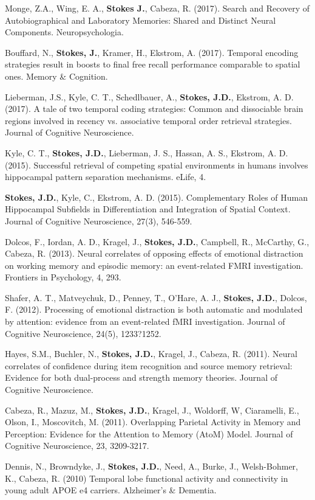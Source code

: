 \documentclass[line,margin,10pt]{res}
\begin{document}
\begin{resume}
Monge, Z.A., Wing, E. A., \textbf{Stokes J.}, Cabeza, R. (2017). Search and Recovery of Autobiographical and Laboratory Memories: Shared and Distinct Neural Components. Neuropsychologia.

Bouffard, N., \textbf{Stokes, J.}, Kramer, H., Ekstrom, A. (2017). Temporal encoding strategies result in boosts to final free recall performance comparable to spatial ones. Memory \& Cognition.

Lieberman, J.S., Kyle, C. T., Schedlbauer, A., \textbf{Stokes, J.D.}, Ekstrom, A. D. (2017). A tale of two temporal coding strategies: Common and dissociable brain regions involved in recency vs. associative temporal order retrieval strategies. Journal of Cognitive Neuroscience.

Kyle, C. T., \textbf{Stokes, J.D.}, Lieberman, J. S., Hassan, A. S., Ekstrom, A. D. (2015). Successful retrieval of competing spatial environments in humans involves hippocampal pattern separation mechanisms. eLife, 4. 

\textbf{Stokes, J.D.}, Kyle, C., Ekstrom, A. D. (2015). Complementary Roles of Human Hippocampal Subfields in Differentiation and Integration of Spatial Context. Journal of Cognitive Neuroscience, 27(3), 546-559. 

Dolcos, F., Iordan, A. D., Kragel, J., \textbf{Stokes, J.D.}, Campbell, R., McCarthy, G., Cabeza, R. (2013). Neural correlates of opposing effects of emotional distraction on working memory and episodic memory: an event-related FMRI investigation. Frontiers in Psychology, 4, 293. 

Shafer, A. T., Matveychuk, D., Penney, T., O'Hare, A. J., \textbf{Stokes, J.D.}, Dolcos, F. (2012). Processing of emotional distraction is both automatic and modulated by attention: evidence from an event-related fMRI investigation. Journal of Cognitive Neuroscience, 24(5), 1233?1252.
 		
Hayes, S.M., Buchler, N., \textbf{Stokes, J.D.}, Kragel, J., Cabeza, R. (2011). Neural correlates of confidence during item recognition and source memory retrieval: Evidence for both dual-process and strength memory theories. Journal of Cognitive Neuroscience.
	
Cabeza, R., Mazuz, M., \textbf{Stokes, J.D.}, Kragel, J., Woldorff, W, Ciaramelli, E., Olson, I., Moscovitch, M. (2011). Overlapping Parietal Activity in Memory and Perception: Evidence for the Attention to Memory (AtoM) Model. Journal of Cognitive Neuroscience, 23, 3209-3217.
	
Dennis, N., Browndyke, J., \textbf{Stokes, J.D.}, Need, A., Burke, J., Welsh-Bohmer, K., Cabeza, R. (2010) Temporal lobe functional activity and connectivity in young adult APOE e4 carriers. Alzheimer's \& Dementia.


\end{resume}
\end{document}

